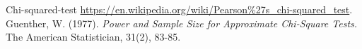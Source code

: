 \documentclass{article}
\begin{document}
\begin{thebibliography}{9}
    Chi-squared-test 
    \url{https://en.wikipedia.org/wiki/Pearson\%27s\_chi-squared\_test}.
    Guenther, W. (1977). 
    \textit{Power and Sample Size for Approximate Chi-Square Tests.} 
    The American Statistician, 31(2), 83-85.

\end{thebibliography}   
\end{document}
